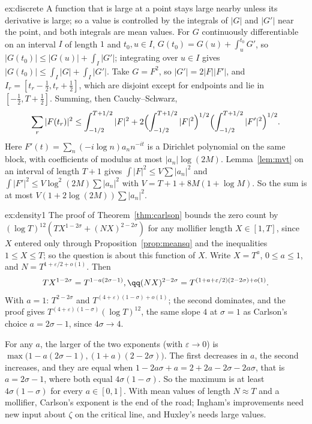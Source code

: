 \begin{solution}{ex:discrete}
\idea A function that is large at a point stays large nearby unless its derivative is large; so a value is controlled by the integrals of $|G|$ and $|G'|$ near the point, and both integrals are mean values.
\writeup For $G$ continuously differentiable on an interval $I$ of length $1$ and $t_0,u\in I$, $G(t_0)=G(u)+\int_u^{t_0}G'$, so $|G(t_0)|\le|G(u)|+\int_I|G'|$; integrating over $u\in I$ gives $|G(t_0)|\le\int_I|G|+\int_I|G'|$. Take $G=F^2$, so $|G'|=2|F||F'|$, and $I_r=[t_r-\frac12,t_r+\frac12]$, which are disjoint except for endpoints and lie in $[-\frac12,T+\frac12]$. Summing, then Cauchy--Schwarz,
\[
\sum_r|F(t_r)|^2\le\int_{-1/2}^{T+1/2}|F|^2+2\Bigl(\int_{-1/2}^{T+1/2}|F|^2\Bigr)^{1/2}\Bigl(\int_{-1/2}^{T+1/2}|F'|^2\Bigr)^{1/2}.
\]
Here $F'(t)=\sum_n(-i\log n)a_nn^{-it}$ is a Dirichlet polynomial on the same block, with coefficients of modulus at most $|a_n|\log(2M)$. Lemma~\ref{lem:mvt} on an interval of length $T+1$ gives $\int|F|^2\le V\sum|a_n|^2$ and $\int|F'|^2\le V\log^2(2M)\sum|a_n|^2$ with $V=T+1+8M(1+\log M)$. So the sum is at most $V(1+2\log(2M))\sum|a_n|^2$.
\end{solution}

\begin{solution}{ex:density1}
\idea The proof of Theorem~\ref{thm:carlson} bounds the zero count by $(\log T)^{12}(TX^{1-2\sigma}+(NX)^{2-2\sigma})$ for any mollifier length $X\in[1,T]$, since $X$ entered only through Proposition~\ref{prop:meansq} and the inequalities $1\le X\le T$; so the question is about this function of $X$.
\writeup Write $X=T^a$, $0\le a\le1$, and $N=T^{1+\varepsilon/2+o(1)}$. Then
\[
\begin{gathered}TX^{1-2\sigma}=T^{1-a(2\sigma-1)},\qq(NX)^{2-2\sigma}=T^{(1+a+\varepsilon/2)(2-2\sigma)+o(1)}.\end{gathered}
\] With $a=1$: $T^{2-2\sigma}$ and $T^{(4+\varepsilon)(1-\sigma)+o(1)}$; the second dominates, and the proof gives $T^{(4+\varepsilon)(1-\sigma)}(\log T)^{12}$, the same slope $4$ at $\sigma=1$ as Carlson's choice
$a=2\sigma-1$, since $4\sigma\to4$.

For any $a$, the larger of the two exponents (with $\varepsilon\to0$) is $\max\bigl(1-a(2\sigma-1),(1+a)(2-2\sigma)\bigr)$. The first decreases in $a$, the second increases, and they are equal when $1-2a\sigma+a=2+2a-2\sigma-2a\sigma$, that is $a=2\sigma-1$, where both equal $4\sigma(1-\sigma)$. So the maximum is at least $4\sigma(1-\sigma)$ for every $a\in[0,1]$. With mean values of length $N\approx T$ and a mollifier, Carlson's exponent is the end of the road; Ingham's improvements need new input about $\zeta$ on the critical line, and Huxley's needs large values.
\end{solution}

